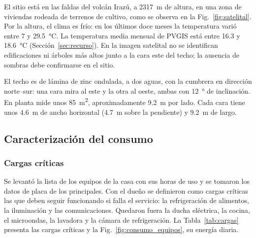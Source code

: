 El sitio está en las faldas del volcán Irazú, a \SI{2317}{m} de altura, en una zona de viviendas rodeada de terrenos de cultivo, como se observa en la Fig.~\ref{fig:satelital}. Por la altura, el clima es frío: en los últimos doce meses la temperatura varió entre 7 y \SI{29.5}{\celsius}. La temperatura media mensual de PVGIS está entre 16.3 y \SI{18.6}{\celsius} (Sección~\ref{sec:recurso}). En la imagen satelital no se identifican edificaciones ni árboles más altos junto a la cara este del techo; la ausencia de sombras debe confirmarse en el sitio.

El techo es de lámina de zinc ondulada, a dos aguas, con la cumbrera en dirección norte--sur: una cara mira al este y la otra al oeste, ambas con \SI{12}{\degree} de inclinación. En planta mide unos \SI{85}{m^2}, aproximadamente \SI{9.2}{m} por lado. Cada cara tiene unos \SI{4.6}{m} de ancho horizontal (\SI{4.7}{m} sobre la pendiente) y \SI{9.2}{m} de largo.

\subsection{Caracterización del consumo}

\subsubsection{Cargas críticas}

Se levantó la lista de los equipos de la casa con sus horas de uso y se tomaron los datos de placa de los principales. Con el dueño se definieron como cargas críticas las que deben seguir funcionando si falla el servicio: la refrigeración de alimentos, la iluminación y las comunicaciones. Quedaron fuera la ducha eléctrica, la cocina, el microondas, la lavadora y la cámara de refrigeración. La Tabla~\ref{tab:cargas} presenta las cargas críticas y la Fig.~\ref{fig:consumo_equipos}, su energía diaria.

